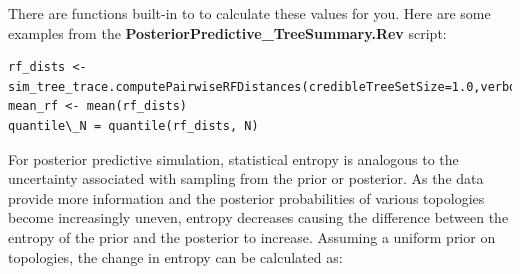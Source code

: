 There are functions built-in to \Revbayes to calculate these values for you. Here are some examples
from the \textbf{PosteriorPredictive\_TreeSummary.Rev} script: 

{\tt \begin{snugshade*}
\begin{lstlisting}
rf_dists <- sim_tree_trace.computePairwiseRFDistances(credibleTreeSetSize=1.0,verbose=FALSE)
mean_rf <- mean(rf_dists)
quantile\_N = quantile(rf_dists, N)
\end{lstlisting}
\end{snugshade*}}

\smallbreak
For posterior predictive simulation, statistical entropy is analogous to the uncertainty associated 
with sampling from the prior or posterior. As the data provide more information and the posterior probabilities of various topologies
become increasingly uneven, entropy decreases causing the difference between the entropy of the prior and the posterior to increase.
Assuming a uniform prior on topologies, the change in entropy can be calculated as:


